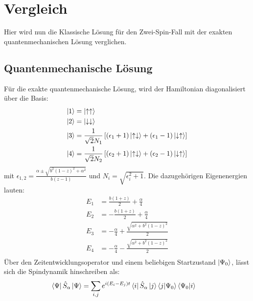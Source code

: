 \chapter{Vergleich}
Hier wird nun die Klassische Lösung für den Zwei-Spin-Fall mit der exakten quantenmechanischen Lösung verglichen.
\section{Quantenmechanische Lösung}
Für die exakte quantenmechanische Lösung, wird der Hamiltonian diagonalisiert über die Basis:
\begin{align}
    \ket{1} &= \ket{\uparrow\uparrow}   \\
    \ket{2} &= \ket{\downarrow\downarrow} \\
    \ket{3} &= \frac{1}{\sqrt{2}N_1}\left[(\epsilon_1+1)\ket{\uparrow\downarrow} +(\epsilon_1-1)\ket{\downarrow\uparrow} \right]\\
    \ket{4} &= \frac{1}{\sqrt{2}N_2}\left[(\epsilon_2+1)\ket{\uparrow\downarrow} +(\epsilon_2-1)\ket{\downarrow\uparrow} \right]
\end{align}
mit $\epsilon_{1,2} = \frac{\alpha \pm \sqrt{b^2(1-z)^2+\alpha^2} }{b(z-1)} $ und $N_{i} = \sqrt{\epsilon_i^2 + 1}$. Die dazugehörigen Eigenenergien lauten:
\begin{align}
    E_1 &= \frac{b(1+z)}{2} + \frac{\alpha}{4}\\
    E_2 &= -\frac{b(1+z)}{2} + \frac{\alpha}{4}\\
    E_3 &= -\frac{\alpha}{4} + \frac{\sqrt{\alpha^2 + b^2(1-z)^2}}{2}\\
    E_4 &= -\frac{\alpha}{4} - \frac{\sqrt{\alpha^2 + b^2(1-z)^2}}{2}\\
\end{align}
\noindent Über den Zeitentwicklungsoperator und einem beliebigen Startzustand $\ket{\Psi_0}$, lässt sich die Spindynamik hinschreiben als:
\begin{align}
    \bra{\Psi}\hat{S}_\alpha\ket{\Psi} &= \sum_{i,j}e^{i(E_i-E_j)t}\bra{i}\hat{S}_\alpha\ket{j}\bra{j}\ket{\Psi_0}\bra{\Psi_0}\ket{i}
\end{align}
